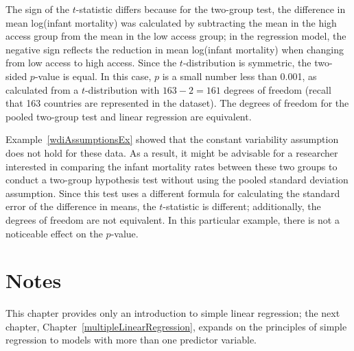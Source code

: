 

The sign of the $t$-statistic differs because for the two-group test, the difference in mean log(infant mortality) was calculated by subtracting the mean in the high access group from the mean in the low access group; in the regression model, the negative sign reflects the reduction in mean log(infant mortality) when changing from low access to high access. Since the $t$-distribution is symmetric, the two-sided $p$-value is equal. In this case, $p$ is a small number less than 0.001, as calculated from a $t$-distribution with $163-2 = 161$ degrees of freedom (recall that 163 countries are represented in the dataset). The degrees of freedom for the pooled two-group test and linear regression are equivalent.

Example~\ref{wdiAssumptionsEx} showed that the constant variability assumption does not hold for these data. As a result, it might be advisable for a researcher interested in comparing the infant mortality rates between these two groups to conduct a two-group hypothesis test without using the pooled standard deviation assumption. Since this test uses a different formula for calculating the standard error of the difference in means, the $t$-statistic is different; additionally, the degrees of freedom are not equivalent. In this particular example, there is not a noticeable effect on the $p$-value.



\newpage

\section{Notes}

This chapter provides only an introduction to simple linear regression; the next chapter, Chapter~\ref{multipleLinearRegression}, expands on the principles of simple regression to models with more than one predictor variable. 


